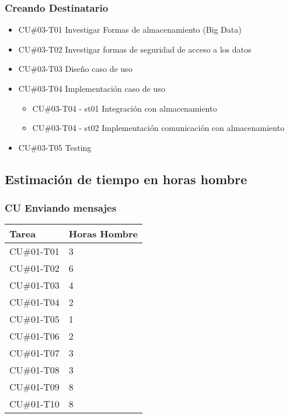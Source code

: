 \documentclass[a4paper, 11pt]{article}
\begin{document}
\subsubsection{Creando Destinatario}
\begin{itemize}
\item{CU\#03-T01} Investigar Formas de almacenamiento (Big Data)
\item{CU\#03-T02} Investigar formas de seguridad de acceso a los datos
\item{CU\#03-T03} Dise\~no caso de uso
\item{CU\#03-T04} Implementaci\'on caso de uso
\begin{itemize}
\item{CU\#03-T04 - st01} Integraci\'on con almacenamiento
\item{CU\#03-T04 - st02} Implementaci\'on comunicaci\'on con almacenamiento
\end{itemize}
\item{CU\#03-T05} Testing
\end{itemize}
\subsection{Estimaci\'on de tiempo en horas hombre}


\subsubsection{CU Enviando mensajes}
\begin{tabular}{| p{5cm} | p{5cm} |}

\hline
\bf{Tarea} & \bf{Horas Hombre} \\ \hline \hline
CU\#01-T01 & 3 \\ \hline
CU\#01-T02 & 6 \\ \hline
CU\#01-T03 & 4 \\ \hline
CU\#01-T04 & 2 \\ \hline
CU\#01-T05 & 1 \\ \hline
CU\#01-T06 & 2 \\ \hline
CU\#01-T07 & 3 \\ \hline
CU\#01-T08 & 3 \\ \hline
CU\#01-T09 & 8 \\ \hline
CU\#01-T10 & 8 \\ \hline
\end{tabular}
\end{document}
